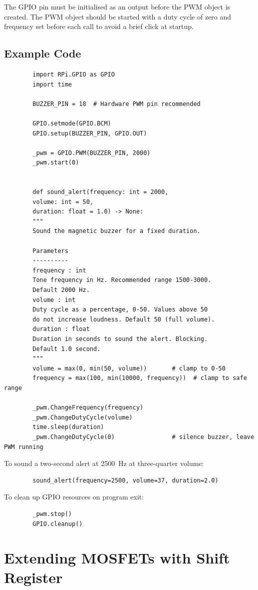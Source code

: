 \documentclass[12pt,letterpaper]{article}
\begin{document}
	The GPIO pin must be initialised as an output before the PWM object is created. The
	PWM object should be started with a duty cycle of zero and frequency set before each
	call to avoid a brief click at startup.
	
	\subsection{Example Code}
	
	\begin{verbatim}
		import RPi.GPIO as GPIO
		import time
		
		BUZZER_PIN = 18  # Hardware PWM pin recommended
		
		GPIO.setmode(GPIO.BCM)
		GPIO.setup(BUZZER_PIN, GPIO.OUT)
		
		_pwm = GPIO.PWM(BUZZER_PIN, 2000)
		_pwm.start(0)
		
		
		def sound_alert(frequency: int = 2000,
		volume: int = 50,
		duration: float = 1.0) -> None:
		"""
		Sound the magnetic buzzer for a fixed duration.
		
		Parameters
		----------
		frequency : int
		Tone frequency in Hz. Recommended range 1500-3000.
		Default 2000 Hz.
		volume : int
		Duty cycle as a percentage, 0-50. Values above 50
		do not increase loudness. Default 50 (full volume).
		duration : float
		Duration in seconds to sound the alert. Blocking.
		Default 1.0 second.
		"""
		volume = max(0, min(50, volume))       # clamp to 0-50
		frequency = max(100, min(10000, frequency))  # clamp to safe range
		
		_pwm.ChangeFrequency(frequency)
		_pwm.ChangeDutyCycle(volume)
		time.sleep(duration)
		_pwm.ChangeDutyCycle(0)                # silence buzzer, leave PWM running
	\end{verbatim}
	
	\noindent To sound a two-second alert at \SI{2500}{\hertz} at three-quarter volume:
	
	\begin{verbatim}
		sound_alert(frequency=2500, volume=37, duration=2.0)
	\end{verbatim}
	
	\noindent To clean up GPIO resources on program exit:
	
	\begin{verbatim}
		_pwm.stop()
		GPIO.cleanup()
	\end{verbatim}
	
	
	
	\section{Extending MOSFETs with Shift Register}
	
\end{document}
